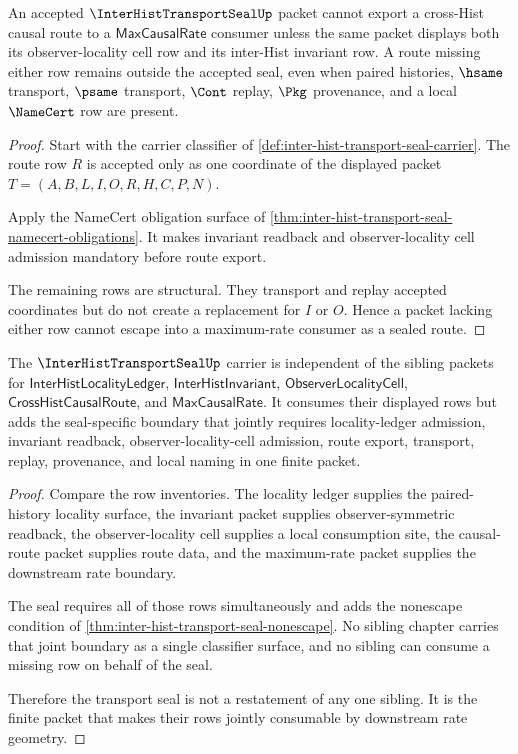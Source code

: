 \begin{theorem}
\label{thm:inter-hist-transport-seal-nonescape}
An accepted $\InterHistTransportSealUp$ packet cannot export a cross-Hist causal route to a $\mathsf{MaxCausalRate}$ consumer unless the same packet displays both its observer-locality cell row and its inter-Hist invariant row. A route missing either row remains outside the accepted seal, even when paired histories, $\hsame$ transport, $\psame$ transport, $\Cont$ replay, $\Pkg$ provenance, and a local $\NameCert$ row are present.
\end{theorem}
\begin{proof}
Start with the carrier classifier of \autoref{def:inter-hist-transport-seal-carrier}. The route row $R$ is accepted only as one coordinate of the displayed packet $T=(A,B,L,I,O,R,H,C,P,N)$.

Apply the NameCert obligation surface of \autoref{thm:inter-hist-transport-seal-namecert-obligations}. It makes invariant readback and observer-locality cell admission mandatory before route export.

The remaining rows are structural. They transport and replay accepted coordinates but do not create a replacement for $I$ or $O$. Hence a packet lacking either row cannot escape into a maximum-rate consumer as a sealed route.
\end{proof}

\begin{theorem}
\label{thm:inter-hist-transport-seal-sibling-independence}
The $\InterHistTransportSealUp$ carrier is independent of the sibling packets for $\mathsf{InterHistLocalityLedger}$, $\mathsf{InterHistInvariant}$, $\mathsf{ObserverLocalityCell}$, $\mathsf{CrossHistCausalRoute}$, and $\mathsf{MaxCausalRate}$. It consumes their displayed rows but adds the seal-specific boundary that jointly requires locality-ledger admission, invariant readback, observer-locality-cell admission, route export, transport, replay, provenance, and local naming in one finite packet.
\end{theorem}
\begin{proof}
Compare the row inventories. The locality ledger supplies the paired-history locality surface, the invariant packet supplies observer-symmetric readback, the observer-locality cell supplies a local consumption site, the causal-route packet supplies route data, and the maximum-rate packet supplies the downstream rate boundary.

The seal requires all of those rows simultaneously and adds the nonescape condition of \autoref{thm:inter-hist-transport-seal-nonescape}. No sibling chapter carries that joint boundary as a single classifier surface, and no sibling can consume a missing row on behalf of the seal.

Therefore the transport seal is not a restatement of any one sibling. It is the finite packet that makes their rows jointly consumable by downstream rate geometry.
\end{proof}

